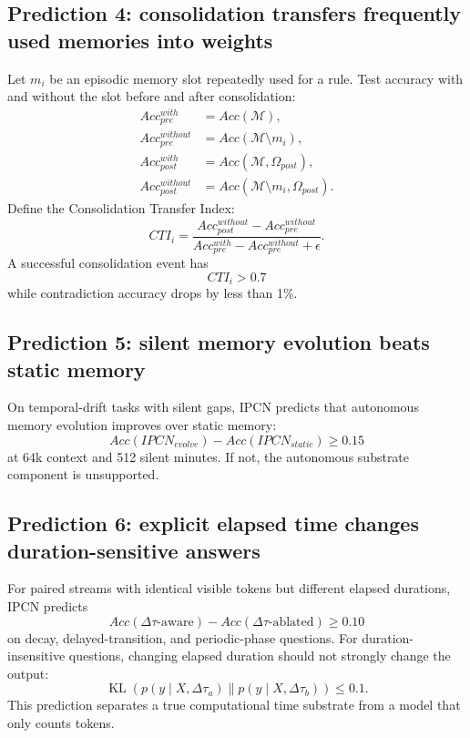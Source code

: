 \documentclass[11pt]{article}
\newcommand{\KL}{\operatorname{KL}}
\newcommand{\Mem}{\mathcal{M}}
\begin{document}
\subsection{Prediction 4: consolidation transfers frequently used memories into weights}

Let \(m_i\) be an episodic memory slot repeatedly used for a rule. Test accuracy with and without the slot before and after consolidation:
\begin{align}
    Acc_{pre}^{with} &= Acc(\Mem),\\
    Acc_{pre}^{without} &= Acc(\Mem\setminus m_i),\\
    Acc_{post}^{with} &= Acc(\Mem,\Omega_{post}),\\
    Acc_{post}^{without} &= Acc(\Mem\setminus m_i,\Omega_{post}).
\end{align}
Define the Consolidation Transfer Index:
\begin{equation}
    CTI_i=\frac{Acc_{post}^{without}-Acc_{pre}^{without}}{Acc_{pre}^{with}-Acc_{pre}^{without}+\epsilon}.
\end{equation}
A successful consolidation event has
\begin{equation}
    CTI_i>0.7
\end{equation}
while contradiction accuracy drops by less than 1\%.

\subsection{Prediction 5: silent memory evolution beats static memory}

On temporal-drift tasks with silent gaps, IPCN predicts that autonomous memory evolution improves over static memory:
\begin{equation}
    Acc(IPCN_{evolve})-Acc(IPCN_{static})\ge 0.15
\end{equation}
at 64k context and 512 silent minutes. If not, the autonomous substrate component is unsupported.


\subsection{Prediction 6: explicit elapsed time changes duration-sensitive answers}

For paired streams with identical visible tokens but different elapsed durations, IPCN predicts
\begin{equation}
    Acc(\Delta\tau\text{-aware})-Acc(\Delta\tau\text{-ablated})\ge 0.10
\end{equation}
on decay, delayed-transition, and periodic-phase questions. For duration-insensitive questions, changing elapsed duration should not strongly change the output:
\begin{equation}
    \KL(p(y\mid X,\Delta\tau_a)\|p(y\mid X,\Delta\tau_b))\le 0.1.
\end{equation}
This prediction separates a true computational time substrate from a model that only counts tokens.
\end{document}
